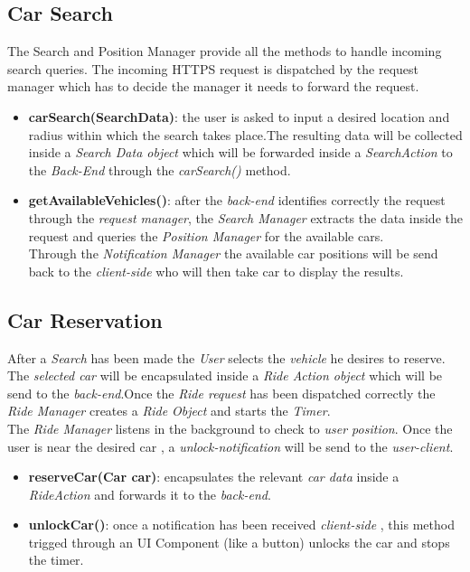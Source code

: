 \newcommand\tab[1][1cm]{\hspace*{#1}}

\subsection{Car Search}
The Search and Position Manager provide all the methods to handle incoming search queries. The incoming HTTPS request is dispatched by 
the request manager which has to decide the manager it needs to forward the request.\\
\begin{itemize}
\item \textbf{carSearch(SearchData)}: the user is asked to input a desired location and radius within which the search takes place.The resulting data will be collected inside a \emph{Search Data object} which will be forwarded inside a \emph{SearchAction} to the \emph{Back-End} through the \emph{carSearch()} method.

\item \textbf{getAvailableVehicles()}: after the \emph{back-end} identifies correctly the request through the \emph{request manager}, the \emph{Search Manager}
extracts the data inside the request and queries the \emph{Position Manager} for the available cars.\\
Through the \emph{Notification Manager} the available car positions will be send back to the \emph{client-side} who will then take car to display the results.
\end{itemize}

\subsection{Car Reservation}
After a \emph{Search} has been made the \emph{User} selects the \emph{vehicle} he desires to reserve. The \emph{selected car} will be encapsulated inside a \emph{Ride Action object} which will be send to the \emph{back-end}.Once the \emph{Ride request} has been dispatched correctly  the \emph{Ride Manager} creates a \emph{Ride Object} and starts the \emph{Timer}.\\The \emph{Ride Manager} listens in the background to check to \emph{user position}. Once the user is near the desired car , a \emph{unlock-notification} will be send to the \emph{user-client}.

\begin{itemize}
\item \textbf{reserveCar(Car car)}: encapsulates the relevant \emph{car data} inside a \emph{RideAction} and forwards it to the \emph{back-end}.

\item \textbf{unlockCar()}: once a notification has been received \emph{client-side} , this method trigged through an UI Component (like a button) unlocks the car and stops the timer.
\end{itemize}

